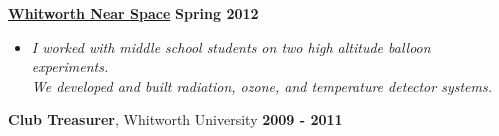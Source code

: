 \documentclass[margin]{res}
\begin{document}
\begin{resume}
\begin{itemize}
    \end{itemize} \vspace{-12pt}
{\bf\href{http://www.whitworthnearspace.org/wiki/Main_Page}{Whitworth Near Space}} \hfill  \textbf{Spring 2012} 
    \begin{itemize}\itemsep -2pt
    \item[] \textit{\small{I worked with middle school students on two high altitude balloon experiments. \\We developed and built radiation, ozone, and temperature detector systems.}}
    \end{itemize}\vspace{-12}
    
{\bf Club Treasurer}, Whitworth University \hfill {\bf2009 - 2011}








\end{resume}
\end{document}

